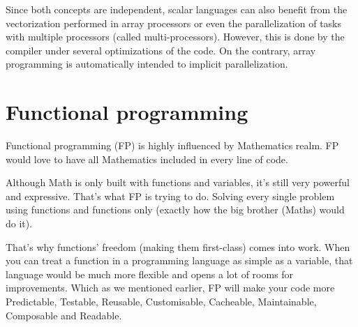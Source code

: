 Since both concepts are independent, scalar languages can also benefit 
from the vectorization performed in array processors or even 
the parallelization of tasks with multiple processors (called multi-processors). 
However, this is done by the compiler under several optimizations of the code.
On the contrary, array programming is automatically intended to implicit parallelization. 



 
 
    \section{Functional programming} \label{sec:fpro}
 
Functional programming (FP) is highly influenced by Mathematics realm. 
FP would love to have all Mathematics included in every line of code.

Although Math is only built with functions and variables, it’s still very powerful and expressive. 
That’s what FP is trying to do. 
Solving every single problem using functions and functions only (exactly how the big brother (Maths) would do it).

That’s why functions’ freedom (making them first-class) comes into work. 
When you can treat a function in a programming language as simple as a variable, that language would be much more flexible and opens a lot of rooms for improvements. 
Which as we mentioned earlier, FP will make your code more Predictable, Testable, Reusable, Customisable, Cacheable, Maintainable, Composable and Readable.
 
 
 
 
 
 
 
 
 
% 
% 




